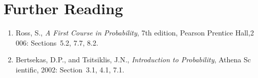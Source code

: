 \section*{Further Reading}

\begin{small}\begin{enumerate}\item Ross, S., \emph{A First Course in Probability}, 7th edition, Pearson Prentice Hall,2
006: Sections~5.2, 7.7, 8.2.
\item Bertsekas, D.P., and Tsitsiklis, J.N., \emph{Introduction to Probability}, Athena Sc
ientific, 2002: Section~3.1, 4.1, 7.1.
\end{enumerate}
\end{small}

